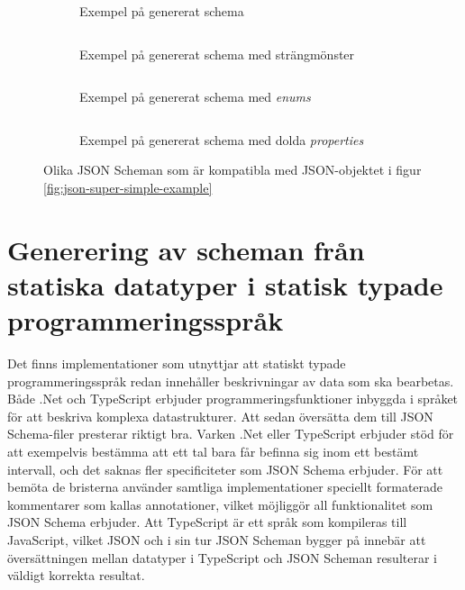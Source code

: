 \begin{figure}
	\begin{subfigure}[t]{0.47\textwidth}
		\inputminted[tabsize=2, frame=single, fontsize=\small, framesep=2mm]{json}{code/schema-generation-example/schema-example1.json}
		\vspace{-1.2em}
		\caption{Exempel på genererat schema}
		\label{fig:schema-super-simple-example-1}
	\end{subfigure}\hfill
	\begin{subfigure}[t]{0.47\textwidth}
		\inputminted[tabsize=2, frame=single, fontsize=\small, framesep=2mm]{json}{code/schema-generation-example/schema-example2.json}
		\vspace{-1.2em}
		\caption{Exempel på genererat schema med strängmönster}
		\label{fig:schema-super-simple-example-2}
		\vspace{.8em}
	\end{subfigure}
	\begin{subfigure}[t]{0.47\textwidth}
		\inputminted[tabsize=2, frame=single, fontsize=\small, framesep=2mm]{json}{code/schema-generation-example/schema-example3.json}
		\vspace{-1.2em}
		\caption{Exempel på genererat schema med \textit{enums}}
		\label{fig:schema-super-simple-example-3}
	\end{subfigure}\hfill
	\begin{subfigure}[t]{0.47\textwidth}
		\inputminted[tabsize=2, frame=single, fontsize=\small, framesep=2mm]{json}{code/schema-generation-example/schema-example4.json}
		\vspace{-1.2em}
		\caption{Exempel på genererat schema med dolda \textit{properties}}
		\label{fig:schema-super-simple-example-4}
	\end{subfigure}
	\caption{Olika JSON Scheman som är kompatibla med JSON-objektet i figur \ref{fig:json-super-simple-example}}
	\label{fig:schema-super-simple-example-group}
\end{figure}

\section{Generering av scheman från statiska datatyper i statisk typade programmeringsspråk}
Det finns implementationer som utnyttjar att statiskt typade programmeringsspråk redan innehåller beskrivningar av data som ska bearbetas. Både .Net och TypeScript erbjuder programmeringsfunktioner inbyggda i språket för att beskriva komplexa datastrukturer. Att sedan översätta dem till JSON Schema-filer presterar riktigt bra. Varken .Net eller TypeScript erbjuder stöd för att exempelvis bestämma att ett tal bara får befinna sig inom ett bestämt intervall, och det saknas fler specificiteter som JSON Schema erbjuder. För att bemöta de bristerna använder samtliga implementationer speciellt formaterade kommentarer som kallas annotationer, vilket möjliggör all funktionalitet som JSON Schema erbjuder. Att TypeScript är ett språk som kompileras till JavaScript, vilket JSON och i sin tur JSON Scheman bygger på innebär att översättningen mellan datatyper i TypeScript och JSON Scheman resulterar i väldigt korrekta resultat. \cite{Newtonsoft,Suter,El-Dardiry,Bovet}


